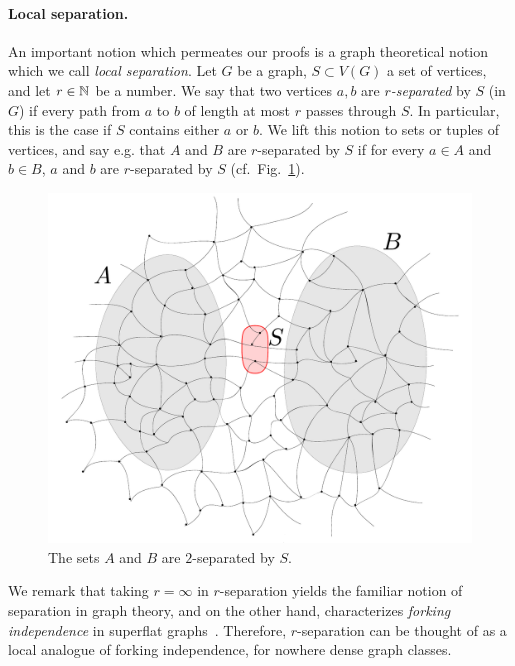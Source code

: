 \paragraph{Local separation.}
An important notion which permeates our proofs
is a graph theoretical notion which we call \emph{local separation}.
Let $G$ be a graph, $S\subset V(G)$ a set of vertices,
and let $r\in \mathbb{N}$ be a number. We say that two vertices $a,b$ are \emph{$r$-separated} by $S$ (in $G$) if every path from $a$ to $b$
of length at most $r$ passes through $S$.
In particular, this is the case if $S$ contains either $a$ or $b$.
We lift this notion to sets or tuples of vertices,
and say e.g. that $A$ and $B$ are $r$-separated by $S$
if for every $a\in A$ and $b\in B$, $a$ and $b$ are $r$-separated by $S$
(cf.~Fig.~\ref{fig:sep}).
 \begin{figure}[h!]
 	\centering
 		\includegraphics[scale=0.35,page=1]{pics}
 	\caption{The sets $A$ and $B$ are $2$-separated by $S$.
 	}
 	\label{fig:sep}
 \end{figure}
We remark that taking $r=\infty$ in $r$-separation yields the familiar notion of separation in graph theory,
and on the other hand, characterizes \emph{forking independence} in superflat graphs~\cite{ivanov}. Therefore,
$r$-separation can be thought of as a local analogue of forking independence, for nowhere dense graph classes.

